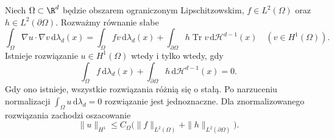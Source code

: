 \begin{twierdzenie}
\label{thm:pde11-neumann}
Niech $\Omega\subset\R^d$ będzie obszarem ograniczonym Lipschitzowskim, $f\in L^2(\Omega)$ oraz
$h\in L^2(\partial\Omega)$.
Rozważmy równanie słabe
\[
\int_\Omega\nabla u\cdot\nabla v\,\mathrm d\lambda_d(x)
=\int_\Omega fv\,\mathrm d\lambda_d(x)
+\int_{\partial\Omega}h\operatorname{Tr}v
\,\mathrm d\mathcal H^{d-1}(x)
\quad(v\in H^1(\Omega)).
\]
Istnieje rozwiązanie $u\in H^1(\Omega)$ wtedy i tylko wtedy, gdy
\[
\int_\Omega f\,\mathrm d\lambda_d(x)
+\int_{\partial\Omega}h\,\mathrm d\mathcal H^{d-1}(x)=0.
\]
Gdy ono istnieje, wszystkie rozwiązania różnią się o stałą.
Po narzuceniu normalizacji $\int_\Omega u\,\mathrm d\lambda_d=0$
rozwiązanie jest jednoznaczne. Dla znormalizowanego
rozwiązania zachodzi oszacowanie
\[
 \|u\|_{H^1}\le C_\Omega
   \bigl(\|f\|_{L^2(\Omega)}+\|h\|_{L^2(\partial\Omega)}\bigr).
\]
\end{twierdzenie}
